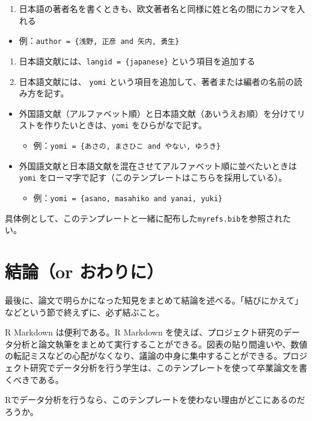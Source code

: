 \documentclass[10.5pt,a4paper,lualatex,ja=standard]{bxjsarticle}
\providecommand{\tightlist}{%
  \setlength{\itemsep}{0pt}\setlength{\parskip}{0pt}}
\begin{document}
\begin{enumerate}
\def\labelenumi{\arabic{enumi}.}
\tightlist
\item
  日本語の著者名を書くときも、欧文著者名と同様に姓と名の間にカンマを入れる
\end{enumerate}

\begin{itemize}
\tightlist
\item
  例：\texttt{author\ =\ \{浅野,\ 正彦\ and\ 矢内,\ 勇生\}}
\end{itemize}

\begin{enumerate}
\def\labelenumi{\arabic{enumi}.}
\setcounter{enumi}{1}
\tightlist
\item
  日本語文献には、\texttt{langid\ =\ \{japanese\}} という項目を追加する
\item
  日本語文献には、 \texttt{yomi} という項目を追加して、著者または編者の名前の読み方を記す。
\end{enumerate}

\begin{itemize}
\tightlist
\item
  外国語文献（アルファベット順）と日本語文献（あいうえお順）を分けてリストを作りたいときは、\texttt{yomi} をひらがなで記す。

  \begin{itemize}
  \tightlist
  \item
    例：\texttt{yomi\ =\ \{あさの,\ まさひこ\ and\ やない,\ ゆうき\}}
  \end{itemize}
\item
  外国語文献と日本語文献を混在させてアルファベット順に並べたいときは \texttt{yomi} をローマ字で記す（このテンプレートはこちらを採用している）。

  \begin{itemize}
  \tightlist
  \item
    例：\texttt{yomi\ =\ \{asano,\ masahiko\ and\ yanai,\ yuki\}}
  \end{itemize}
\end{itemize}

具体例として、このテンプレートと一緒に配布した\texttt{myrefs.bib}を参照されたい。

\citet{moe1984}

\section{結論（or おわりに）}\label{ux7d50ux8ad6or-ux304aux308fux308aux306b}

最後に、論文で明らかになった知見をまとめて結論を述べる。「結びにかえて」などという節で終えずに、必ず結ぶこと。

R Markdown は便利である。R Markdown を使えば、プロジェクト研究のデータ分析と論文執筆をまとめて実行することができる。図表の貼り間違いや、数値の転記ミスなどの心配がなくなり、議論の中身に集中することができる。プロジェクト研究でデータ分析を行う学生は、このテンプレートを使って卒業論文を書くべきである。

Rでデータ分析を行うなら、このテンプレートを使わない理由がどこにあるのだろうか。

\citet{moe1984}



\end{document}
